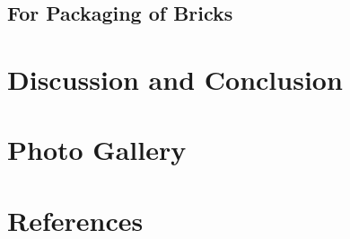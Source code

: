 \documentclass{article}
\begin{document}
\subsection{For Packaging of Bricks}

\section{Discussion and Conclusion}

\section{Photo Gallery}

\section{References}
\end{document}
